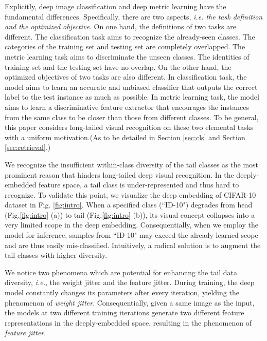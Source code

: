\documentclass[final]{cvpr}
\def\ie{\textit{i.e.}}
\begin{document}
Explicitly, deep image classification and deep metric learning  have the fundamental differences. Specifically, there are two aspects, \emph{i.e. the task definition and the optimized objective}. On one hand, the definitions of two tasks are different. The classification task aims to recognize the already-seen classes. The categories of the training set and testing set are completely overlapped. The metric learning task aims to discriminate the unseen classes. The identities of training set and the testing set have no overlap. On the other hand, the optimized objectives of two tasks are also different. In classification task, the model aims to learn an accurate and unbiased classifier that outputs the correct label to the test instance as much as possible. In metric learning task, the model aims to learn a discriminative feature extractor that encourages the instances from the same class to be closer than those from different classes. To be general, this paper considers long-tailed visual recognition on these two elemental tasks with a uniform motivation.(As to be detailed in Section \ref{sec:cls} and Section \ref{sec:retrieval}.)

We recognize the insufficient within-class diversity of the tail classes as the most prominent reason that hinders long-tailed deep visual recognition. In the deeply-embedded feature space, a tail class is under-represented and thus hard to recognize. To validate this point, we visualize the deep embedding of CIFAR-10 dataset in Fig. \ref{fig:intro}. When a specified class (``ID-10") degrades from head (Fig.\ref{fig:intro} {(a)}) to tail (Fig.\ref{fig:intro} {(b)}), its visual concept collapses into a very limited scope in the deep embedding. Consequentially, when we employ the model for inference, samples from ``ID-10" may exceed the already-learned scope and are thus easily mis-classified. Intuitively, a radical solution is to augment the tail classes with higher diversity.

We notice two phenomena which are potential for enhancing the tail data diversity, \ie, the weight jitter and the feature jitter. During training, the deep model constantly changes its parameters after every iteration, yielding the phenomenon of \emph{weight jitter}. Consequentially, given a same image as the input, the models at two different training iterations generate two different feature representations in the deeply-embedded space, resulting in the phenomenon of \emph{feature jitter}. 
\end{document}
